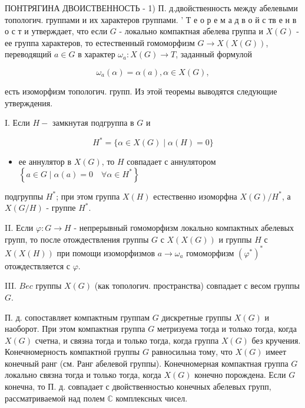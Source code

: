 \documentclass[10pt]{article}
\begin{document}
ПОНТРЯГИНА ДВОИСТВЕННОСТЬ - 1) П. д.двойственность между абелевыми топологич. группами и их характеров группами. ' Т е о р е м а д в о й с тв е н в о с т и утверждает, что если $G$ - локально компактная абелева группа и $X(G)$ - ее группа характеров, то естественный гомоморфизм $G \rightarrow X(X(G))$, переводящий $a \in G$ в характер $\omega_{a}: X(G) \rightarrow T$, заданный формулой



\[

\omega_{a}(\alpha)=\alpha(a), \alpha \in X(G),

\]



есть изоморфизм топологич. групп. Из этой теоремы выводятся следующие утверждения.



I. Если $H-$ замкнутая подгруппа в $G$ и



\[

H^{*}=\{\alpha \in X(G) \mid \alpha(H)=0\}

\]



\begin{itemize}

  \item ее аннулятор в $X(G)$, то $H$ совпадает с аннулятором $\left\{a \in G \mid \alpha(a)=0 \quad \forall \alpha \in H^{*}\right\}$

\end{itemize}



подгруппы $H^{*}$; при этом группа $X(H)$ естественно изоморфна $X(G) / H^{*}$, а $X(G / H)$ - группе $H^{*}$.



II. Если $\varphi: G \rightarrow H$ - непрерывный гомоморфизм локально компактных абелевых групп, то после отождествления группы $G$ с $X(X(G))$ и группы $H$ с $X(X(H))$ при помощи изоморфизмов $a \rightarrow \omega_{a}$ гомоморфизм $\left(\varphi^{*}\right)^{*}$ отождествляется с $\varphi$.



III. $B e c$ группы $X(G)$ (как топологич. пространства) совпадает с весом группы $G$.



П. д. сопоставляет компактным группам $G$ дискретные группы $X(G)$ и наоборот. При этом компактная группа $G$ метризуема тогда и только тогда, когда $X(G)$ счетна, и связна тогда и только тогда, когда группа $X(G)$ без кручения. Конечномерность компактной группы $G$ равносильна тому, что $X(G)$ имеет конечный ранг (см. Ранг абелевой группы). Конечномерная компактная группа $G$ локально связна тогда и только тогда, когда $X(G)$ конечно порождена. Если $G$ конечна, то П. д. совпадает с двойственностью конечных абелевых групп, рассматриваемой над полем $\mathbb{C}$ комплексных чисел.
\end{document}
